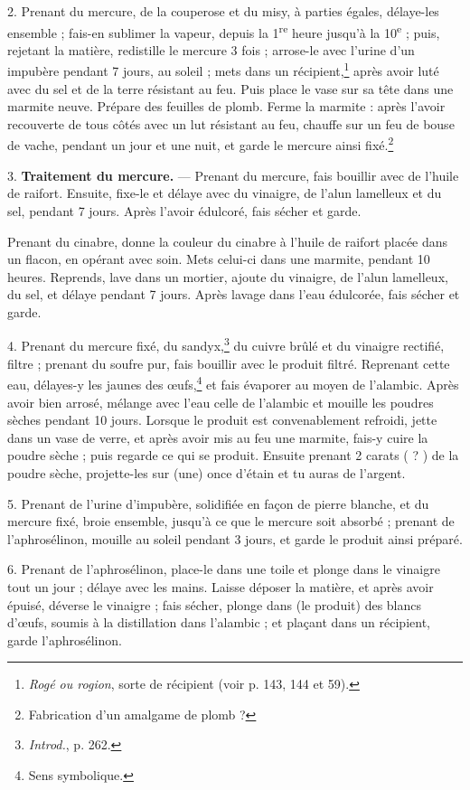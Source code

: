 \documentclass[a4paper, 11pt, oneside, polutonikogreek, french]{article}
\begin{document}
2. Prenant du mercure, de la couperose et du misy, à parties égales, délaye-les ensemble ; fais-en sublimer la vapeur, depuis la 1\textsuperscript{re} heure jusqu'à la 10\textsuperscript{e} ; puis, rejetant la matière, redistille le mercure 3 fois ; arrose-le avec l'urine d'un impubère pendant 7 jours, au soleil ; mets dans un récipient,\footnote{\emph{Rogé ou rogion}, sorte de récipient (voir p. 143, 144 et 59).} après avoir luté avec du sel et de la terre résistant au feu. Puis place le vase sur sa tête dans une marmite neuve. Prépare des feuilles de plomb. Ferme la marmite : après l'avoir recouverte de tous côtés avec un lut résistant au feu, chauffe sur un feu de bouse de vache, pendant un jour et une nuit, et garde le mercure ainsi fixé.\footnote{Fabrication d'un amalgame de plomb ?}

3. \textbf{Traitement du mercure.} --- Prenant du mercure, fais bouillir avec de l'huile de raifort. Ensuite, fixe-le et délaye avec du vinaigre, de l'alun lamelleux et du sel, pendant 7 jours. Après l'avoir édulcoré, fais sécher et garde.

Prenant du cinabre, donne la couleur du cinabre à l'huile de raifort placée dans un flacon, en opérant avec soin. Mets celui-ci dans une marmite, pendant 10 heures. Reprends, lave dans un mortier, ajoute du vinaigre, de l'alun lamelleux, du sel, et délaye pendant 7 jours. Après lavage dans l'eau édulcorée, fais sécher et garde.

4. Prenant du mercure fixé, du sandyx,\footnote{\emph{Introd.}, p. 262.} du cuivre brûlé et du vinaigre rectifié, filtre ; prenant du soufre pur, fais bouillir avec le produit filtré. Reprenant cette eau, délayes-y les jaunes des œufs,\footnote{Sens symbolique.} et fais évaporer au moyen de l'alambic. Après avoir bien arrosé, mélange avec l'eau celle de l'alambic et mouille les poudres sèches pendant 10 jours. Lorsque le produit est convenablement refroidi, jette dans un vase de verre, et après avoir mis au feu une marmite, fais-y cuire la poudre sèche ; puis regarde ce qui se produit. Ensuite prenant 2 carats ( ? ) de la poudre sèche, projette-les sur (une) once d'étain et tu auras de l'argent.

5. Prenant de l'urine d'impubère, solidifiée en façon de pierre blanche, et du mercure fixé, broie ensemble, jusqu'à ce que le mercure soit absorbé ; prenant de l'aphrosélinon, mouille au soleil pendant 3 jours, et garde le produit ainsi préparé.

6. Prenant de l'aphrosélinon, place-le dans une toile et plonge dans le vinaigre tout un jour ; délaye avec les mains. Laisse déposer la matière, et après avoir épuisé, déverse le vinaigre ; fais sécher, plonge dans (le produit) des blancs d'œufs, soumis à la distillation dans l'alambic ; et plaçant dans un récipient, garde l'aphrosélinon.
\end{document}

